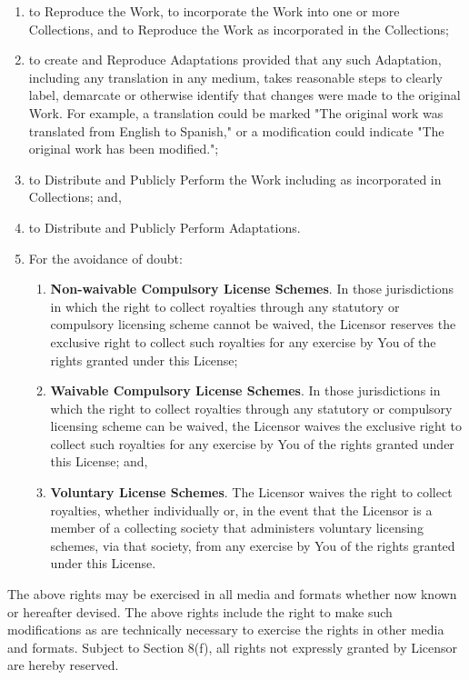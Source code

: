 \begin{enumerate}
\item
  to Reproduce the Work, to incorporate the Work into one or more
  Collections, and to Reproduce the Work as incorporated in the
  Collections;
\item
  to create and Reproduce Adaptations provided that any such
  Adaptation, including any translation in any medium, takes
  reasonable steps to clearly label, demarcate or otherwise identify
  that changes were made to the original Work. For example, a
  translation could be marked "The original work was translated from
  English to Spanish," or a modification could indicate "The original
  work has been modified.";
\item
  to Distribute and Publicly Perform the Work including as
  incorporated in Collections; and,
\item
  to Distribute and Publicly Perform Adaptations.
\item
  For the avoidance of doubt:

  \begin{enumerate}
  \item
    \textbf{Non-waivable Compulsory License Schemes}. In those
    jurisdictions in which the right to collect royalties through any
    statutory or compulsory licensing scheme cannot be waived, the
    Licensor reserves the exclusive right to collect such royalties for
    any exercise by You of the rights granted under this License;
  \item
    \textbf{Waivable Compulsory License Schemes}. In those
    jurisdictions in which the right to collect royalties through any
    statutory or compulsory licensing scheme can be waived, the
    Licensor waives the exclusive right to collect such royalties for
    any exercise by You of the rights granted under this License; and,
  \item
    \textbf{Voluntary License Schemes}. The Licensor waives the right
    to collect royalties, whether individually or, in the event that
    the Licensor is a member of a collecting society that administers
    voluntary licensing schemes, via that society, from any exercise by
    You of the rights granted under this License.
  \end{enumerate}
\end{enumerate}
The above rights may be exercised in all media and formats whether
now known or hereafter devised. The above rights include the right
to make such modifications as are technically necessary to exercise
the rights in other media and formats. Subject to Section 8(f), all
rights not expressly granted by Licensor are hereby reserved.

